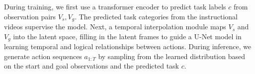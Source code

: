 During training, we first use a transformer encoder to predict task labels $c$ from observation pairs ${V_{s}, V_{g}}$. The predicted task categories from the instructional videos supervise the model. Next, a temporal interpolation module maps $V_{s}$ and $V_{g}$ into the latent space, filling in the latent frames to guide a U-Net model in learning temporal and logical relationships between actions. During inference, we generate action sequences $a_{1:T}$ by sampling from the learned distribution based on the start and goal observations and the predicted task $c$.

